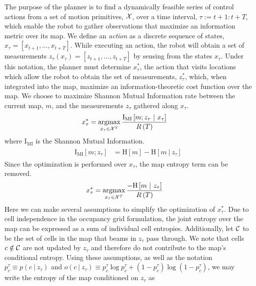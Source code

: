 \documentclass[conference]{IEEEtran}
\begin{document}
The purpose of the planner is to find a dynamically feasible series of control actions from a set of motion primitives, $\mathcal{X}$, over a time interval, $\tau := t+1 : t+T$, which enable the robot to gather observations that maximize an information metric over its map. We define an \textit{action} as a discrete sequence of states, $x_{\tau} = \left[x_{t+1},\dots,x_{t+T}\right]$. While executing an action, the robot will obtain a set of measurements $z_{\tau}(x_{\tau}) = \left[z_{t+1},\dots,z_{t+T}\right]$ by sensing from the states $x_{\tau}$. Under this notation, the planner must determine $x_{\tau}^{*}$, the action that visits locations which allow the robot to obtain the set of measurements, $z_{\tau}^{*}$, which, when integrated into the map, maximize an information-theoretic cost function over the map. We choose to maximize Shannon Mutual Information rate between the current map, $m$, and the measurements $z_{\tau}$ gathered along $x_{\tau}$.
%
\begin{align}
  \begin{split}
    x_{\tau}^{*}
    &=
    \argmax_{x_{\tau} \in \mc{X}^{T}}
    \frac{\text{I}_{\text{MI}}
      \left[
        m
        ;
        z_{\tau}
        \ \vert \
        x_{\tau}
      \right]
    }
    {R\left(T\right)}
  \end{split}
\end{align}
%
where $\text{I}_{\text{MI}}$ is the Shannon Mutual Information.
%
\begin{align}
  \begin{split}
    \text{I}_{\text{MI}}
    \left[
      m
      ;
      z_{\tau}
    \right]
    &=
    \text{H}
    \left[
      m
    \right]
    -
    \text{H}
    \left[
      m
      \ \vert \
      z_{\tau}
    \right]
  \end{split}
\end{align}
%
Since the optimization is performed over $x_{\tau}$, the map entropy term can be removed.
%
\begin{align}
  \begin{split}
    x_{\tau}^{*}
    &=
    \argmax_{x_{\tau} \in \mc{X}^{T}}
    \frac{
      -
      \text{H}
      \left[
        m
        \ \vert \
        z_{\tau}
      \right]
    }
    {
      R
      \left(
      T
      \right)
    }
  \end{split}
\end{align}
%
Here we can make several assumptions to simplify the optimization of $x_{\tau}^{*}$. Due to cell independence in the occupancy grid formulation, the joint entropy over the map can be expressed as a sum of individual cell entropies. Additionally, let $\mathcal{C}$ to be the set of cells in the map that beams in $z_{\tau}$ pass through. We note that cells $c \notin \mathcal{C}$ are not updated by $z_{\tau}$ and therefore do not contribute to the map's conditional entropy. Using these assumptions, as well as the notation $p_c^{\tau} \equiv p(c \ \vert \ z_{\tau})$ and $o(c \ \vert \ z_{\tau}) \equiv p_{c}^{\tau}\log p_{c}^{\tau} + (1 - p_{c}^{\tau})\log (1 - p_{c}^{\tau})$, we may write the entropy of the map conditioned on $z_{\tau}$ as
\end{document}
